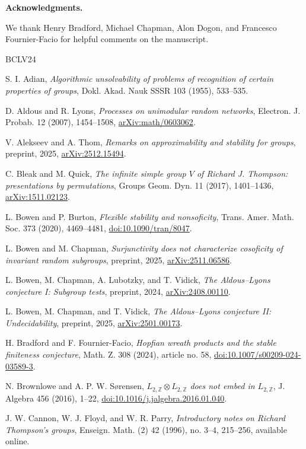 \documentclass[10pt]{article}
\newcommand{\Z}{\mathbb{Z}}
\newcommand{\subhead}[1]{\par\medskip\noindent\textbf{#1}\par\smallskip}
\begin{document}
\subhead{Acknowledgments.}
We thank Henry Bradford, Michael Chapman, Alon Dogon, and Francesco Fournier-Facio for helpful comments on the manuscript.

\begin{thebibliography}{BCLV24}

S. I. Adian, \emph{Algorithmic unsolvability of problems of recognition of certain properties of groups}, Dokl. Akad. Nauk SSSR 103 (1955), 533--535.

D. Aldous and R. Lyons, \emph{Processes on unimodular random networks}, Electron. J. Probab. 12 (2007), 1454--1508, \url{arXiv:math/0603062}.

V. Alekseev and A. Thom, \emph{Remarks on approximability and stability for groups}, preprint, 2025, \url{arXiv:2512.15494}.

C. Bleak and M. Quick, \emph{The infinite simple group $V$ of Richard J. Thompson: presentations by permutations}, Groups Geom. Dyn. 11 (2017), 1401--1436, \url{arXiv:1511.02123}.

L. Bowen and P. Burton, \emph{Flexible stability and nonsoficity}, Trans. Amer. Math. Soc. 373 (2020), 4469--4481, \url{doi:10.1090/tran/8047}.

L. Bowen and M. Chapman, \emph{Surjunctivity does not characterize cosoficity of invariant random subgroups}, preprint, 2025, \url{arXiv:2511.06586}.

L. Bowen, M. Chapman, A. Lubotzky, and T. Vidick, \emph{The Aldous--Lyons conjecture I: Subgroup tests}, preprint, 2024, \url{arXiv:2408.00110}.

L. Bowen, M. Chapman, and T. Vidick, \emph{The Aldous--Lyons conjecture II: Undecidability}, preprint, 2025, \url{arXiv:2501.00173}.

H. Bradford and F. Fournier-Facio, \emph{Hopfian wreath products and the stable finiteness conjecture}, Math. Z. 308 (2024), article no. 58, \url{doi:10.1007/s00209-024-03589-3}.

N. Brownlowe and A. P. W. Sørensen, \emph{$L_{2,\Z}\otimes L_{2,\Z}$ does not embed in $L_{2,\Z}$}, J. Algebra 456 (2016), 1--22, \url{doi:10.1016/j.jalgebra.2016.01.040}.

J. W. Cannon, W. J. Floyd, and W. R. Parry, \emph{Introductory notes on Richard Thompson's groups}, Enseign. Math. (2) 42 (1996), no. 3--4, 215--256, available online.


\end{thebibliography}
\end{document}
